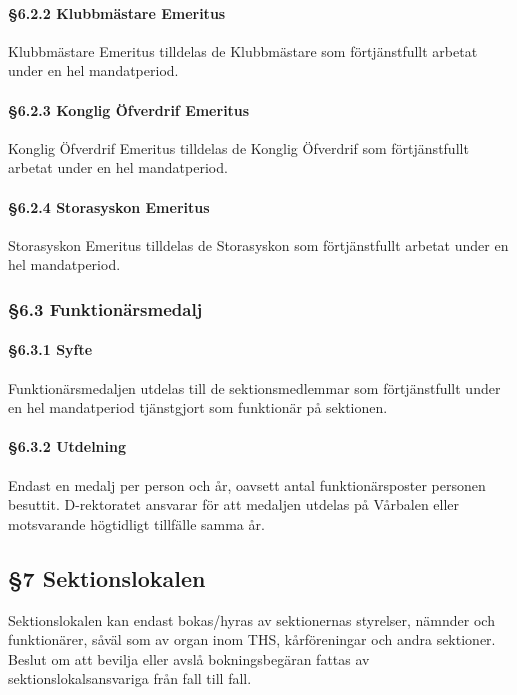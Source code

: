\paragraph{§6.2.2 Klubbmästare Emeritus}

Klubbmästare Emeritus tilldelas de Klubbmästare som förtjänstfullt arbetat under en hel mandatperiod.

\paragraph{§6.2.3 Konglig Öfverdrif Emeritus}

Konglig Öfverdrif Emeritus tilldelas de Konglig Öfverdrif som förtjänstfullt arbetat under en hel mandatperiod.

\paragraph{§6.2.4 Storasyskon Emeritus}

Storasyskon Emeritus tilldelas de Storasyskon som förtjänstfullt arbetat under en hel mandatperiod.

\subsubsection{§6.3 Funktionärsmedalj}

\paragraph{§6.3.1 Syfte}

Funktionärsmedaljen utdelas till de sektionsmedlemmar som förtjänstfullt under en hel mandatperiod tjänstgjort som funktionär på sektionen.

\paragraph{§6.3.2 Utdelning}

Endast en medalj per person och år, oavsett antal funktionärsposter personen besuttit. D-rektoratet ansvarar för att medaljen utdelas på Vårbalen eller motsvarande högtidligt tillfälle samma år.

\subsection{§7 Sektionslokalen}

Sektionslokalen kan endast bokas/hyras av sektionernas styrelser, nämnder och funktionärer, såväl som av organ inom THS, kårföreningar och andra sektioner. Beslut om att bevilja eller avslå bokningsbegäran fattas av sektionslokalsansvariga från fall till fall.

